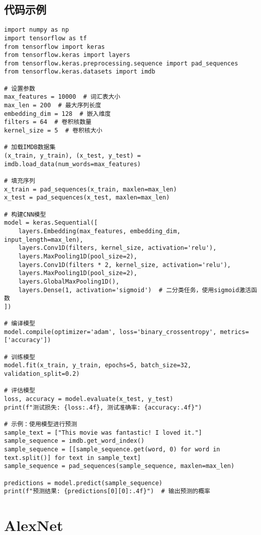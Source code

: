 \subsection*{代码示例}
\begin{lstlisting}
import numpy as np
import tensorflow as tf
from tensorflow import keras
from tensorflow.keras import layers
from tensorflow.keras.preprocessing.sequence import pad_sequences
from tensorflow.keras.datasets import imdb

# 设置参数
max_features = 10000  # 词汇表大小
max_len = 200  # 最大序列长度
embedding_dim = 128  # 嵌入维度
filters = 64  # 卷积核数量
kernel_size = 5  # 卷积核大小

# 加载IMDB数据集
(x_train, y_train), (x_test, y_test) = imdb.load_data(num_words=max_features)

# 填充序列
x_train = pad_sequences(x_train, maxlen=max_len)
x_test = pad_sequences(x_test, maxlen=max_len)

# 构建CNN模型
model = keras.Sequential([
    layers.Embedding(max_features, embedding_dim, input_length=max_len),
    layers.Conv1D(filters, kernel_size, activation='relu'),
    layers.MaxPooling1D(pool_size=2),
    layers.Conv1D(filters * 2, kernel_size, activation='relu'),
    layers.MaxPooling1D(pool_size=2),
    layers.GlobalMaxPooling1D(),
    layers.Dense(1, activation='sigmoid')  # 二分类任务，使用sigmoid激活函数
])

# 编译模型
model.compile(optimizer='adam', loss='binary_crossentropy', metrics=['accuracy'])

# 训练模型
model.fit(x_train, y_train, epochs=5, batch_size=32, validation_split=0.2)

# 评估模型
loss, accuracy = model.evaluate(x_test, y_test)
print(f"测试损失: {loss:.4f}, 测试准确率: {accuracy:.4f}")

# 示例：使用模型进行预测
sample_text = ["This movie was fantastic! I loved it."]
sample_sequence = imdb.get_word_index()
sample_sequence = [[sample_sequence.get(word, 0) for word in text.split()] for text in sample_text]
sample_sequence = pad_sequences(sample_sequence, maxlen=max_len)

predictions = model.predict(sample_sequence)
print(f"预测结果: {predictions[0][0]:.4f}")  # 输出预测的概率

\end{lstlisting}


\section{AlexNet}
